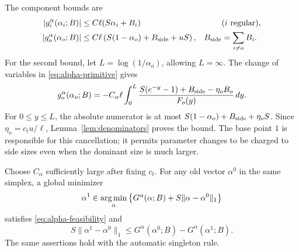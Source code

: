 The component bounds are
\begin{equation}\label{eq:alpha-component-bounds}
\begin{aligned}
 |g_i^\alpha(\alpha_i;B)|
   &\le C\ell(S\alpha_i+B_i) &&(i\text{ regular}),\\
 |g_o^\alpha(\alpha_o;B)|
   &\le C\ell\left(S(1-\alpha_o)+B_{\rm side}+uS\right),
   & B_{\rm side}&=\sum_{i\ne o}B_i.
\end{aligned}
\end{equation}
For the second bound, let $L=\log(1/\alpha_o)$, allowing $L=\infty$.
The change of variables in \eqref{eq:alpha-primitive} gives
\[
 g_o^\alpha(\alpha_o;B)
  =-C_\alpha\ell\int_0^L
       \frac{S(e^{-y}-1)+B_{\rm side}-\eta_o B_o}{F_o(y)}\,dy.
\]
For $0\le y\le L$, the absolute numerator is at most
$S(1-\alpha_o)+B_{\rm side}+\eta_o S$.
Since $\eta_o=c_tu/\ell$, Lemma~\ref{lem:denominators} proves
the bound.  The base point $1$ is responsible for this cancellation;
it permits parameter changes to be charged to side sizes even when
the dominant size is much larger.

\begin{lemma}\label{lem:alpha-tracker}
Choose $C_\alpha$ sufficiently large after fixing $c_t$.
For any old vector $\alpha^0$ in the same simplex, a global minimizer
\begin{equation}\label{eq:alpha-minimization}
 \alpha^1\in\operatorname*{arg\,min}_\alpha
       \left\{G^\alpha(\alpha;B)+S\|\alpha-\alpha^0\|_1\right\}
\end{equation}
satisfies \eqref{eq:alpha-feasibility} and
\begin{equation}\label{eq:alpha-update-payment}
 S\|\alpha^1-\alpha^0\|_1
       \le G^\alpha(\alpha^0;B)-G^\alpha(\alpha^1;B).
\end{equation}
The same assertions hold with the automatic singleton rule.
\end{lemma}

